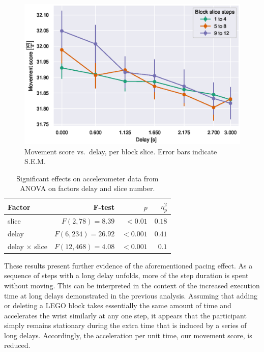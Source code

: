 \begin{figure}[h]
  \centering
  \includegraphics[width=.8\textwidth]{publications/2021ImpactDelayedResponse/Fig10.eps}
  \caption{Movement score vs.\ delay, per block slice. Error bars indicate S.E.M.}\label{fig:acc:delayslice}
\end{figure}

\begin{table}[h]
  \centering
  \caption{Significant effects on accelerometer data from ANOVA on factors delay and slice number.}\label{tab:anova:acc:slice}
  \setlength{\tabcolsep}{0pt} %
  \begin{tabular*}{\columnwidth}{@{\extracolsep{\fill}\quad}lrrr@{}}
    \toprule
    \textbf{Factor} & \textbf{F-test} & \textbf{\(p\)} & \textbf{\(\eta^{2}_{p}\)} \\
    \midrule 
    slice & \(F(2, 78) = 8.39\) & \(<0.01\) & \(0.18\) \\
    delay & \(F(6, 234) = 26.92\) & \(<0.001\) & \(0.41\) \\
    delay \(\times\) slice & \(F(12, 468) = 4.08\) & \(<0.001\) & \(0.1\) \\
    \bottomrule
  \end{tabular*}%
\end{table}

These results present further evidence of the aforementioned pacing effect.
As a sequence of steps with a long delay unfolds, more of the step duration is spent without moving.
This can be interpreted in the context of the increased execution time at long delays demonstrated in the previous analysis.
Assuming that adding or deleting a LEGO block takes essentially the same amount of time and accelerates the wrist similarly at any one step, it appears that the participant simply remains stationary during the extra time that is induced by a series of long delays.
Accordingly, the acceleration per unit time, our movement score, is reduced.

